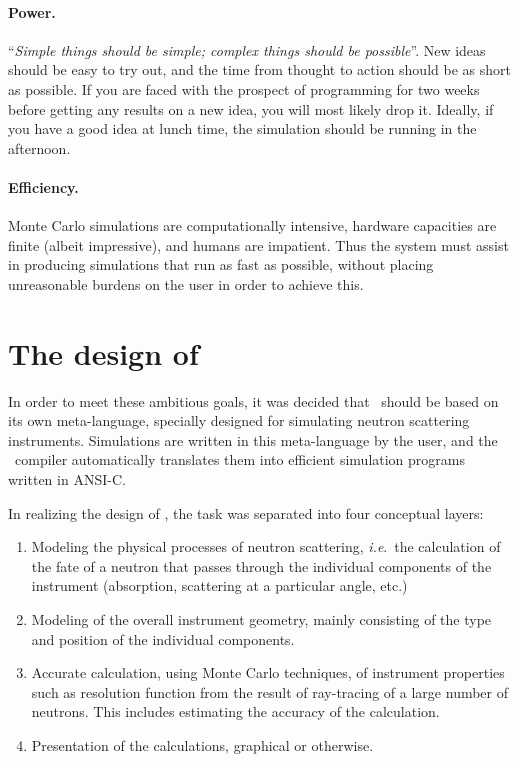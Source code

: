 \paragraph{Power.}
``\textit{Simple things should be simple; complex things should be possible}''.
New ideas should be easy to try out, and the time from thought to action
should be as short as possible. If you are faced with the prospect of programming for
two weeks before getting any results on a new idea, you will most likely drop
it. Ideally, if you have a good idea at lunch time, the simulation
should be running in the afternoon.
%
\paragraph{Efficiency.}
Monte Carlo simulations are computationally intensive, hardware capacities
are finite (albeit impressive), and humans are impatient. Thus the
system must assist in producing simulations that run as fast as
possible, without placing unreasonable burdens on the user in order to
achieve this.


\section{The design of \MCS}
\label{s:design}

In order to meet these ambitious goals, it was decided that \MCS\ should
be based on its own meta-language, specially designed for
simulating neutron scattering instruments. Simulations are written in
this meta-language by the user, and the \MCS\ compiler automatically
translates them into efficient simulation programs written in ANSI-C.

In realizing the design of \MCS, the task was
separated into four conceptual layers:
\begin{enumerate}
\item Modeling the physical processes of neutron scattering, \textit{i.e}.\ 
  the calculation of the fate of a neutron that passes through the
  individual components of the instrument (absorption, scattering at a
  particular angle, etc.)
\item Modeling of the overall instrument geometry, mainly consisting
  of the type and position of the individual components.
\item Accurate calculation, using Monte Carlo techniques, of
  instrument properties such as resolution function from the result of
  ray-tracing of a large number of neutrons. This includes estimating
  the accuracy of the calculation.
\item Presentation of the calculations, graphical or otherwise.
\end{enumerate}

